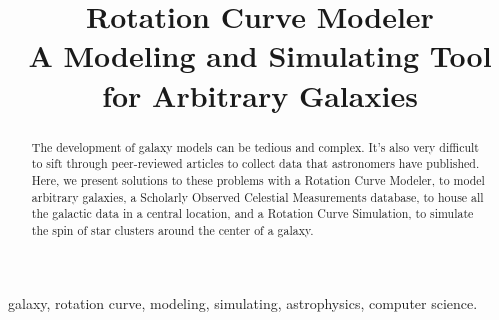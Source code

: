 \documentclass[conference]{IEEEtran}
\begin{document}
\title{Rotation Curve Modeler \\ \Large{A Modeling and Simulating Tool for Arbitrary Galaxies}}


\author{
}


\maketitle

\begin{abstract}

The development of galaxy models can be tedious and complex. It's also very difficult to sift through peer-reviewed articles to collect data that astronomers have published. Here, we present solutions to these problems with a Rotation Curve Modeler, to model arbitrary galaxies, a Scholarly Observed Celestial Measurements database, to house all the galactic data in a central location, and a Rotation Curve Simulation, to simulate the spin of star clusters around the center of a galaxy.
\end{abstract}


\begin{IEEEkeywords}
galaxy, rotation curve, modeling, simulating, astrophysics, computer science.
\end{IEEEkeywords}


\IEEEpeerreviewmaketitle
\end{document}
